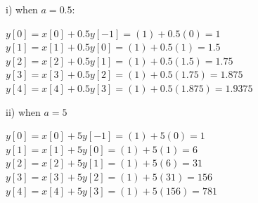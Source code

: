 \documentclass[a4paper, 10pt]{article}
\begin{document}
\hfill

\noindent i) when $a=0.5$:
\begin{center}
  $y[0]=x[0]+0.5y[-1]=(1)+0.5(0)=1$\\
  $y[1]=x[1]+0.5y[0]=(1)+0.5(1)=1.5$\\
  $y[2]=x[2]+0.5y[1]=(1)+0.5(1.5)=1.75$\\
  $y[3]=x[3]+0.5y[2]=(1)+0.5(1.75)=1.875$\\
  $y[4]=x[4]+0.5y[3]=(1)+0.5(1.875)=1.9375$\\
\end{center}
ii) when $a=5$
\begin{center}
  $y[0]=x[0]+5y[-1]=(1)+5(0)=1$\\
  $y[1]=x[1]+5y[0]=(1)+5(1)=6$\\
  $y[2]=x[2]+5y[1]=(1)+5(6)=31$\\
  $y[3]=x[3]+5y[2]=(1)+5(31)=156$\\
  $y[4]=x[4]+5y[3]=(1)+5(156)=781$\\
\end{center}

\hfill
\end{document}

